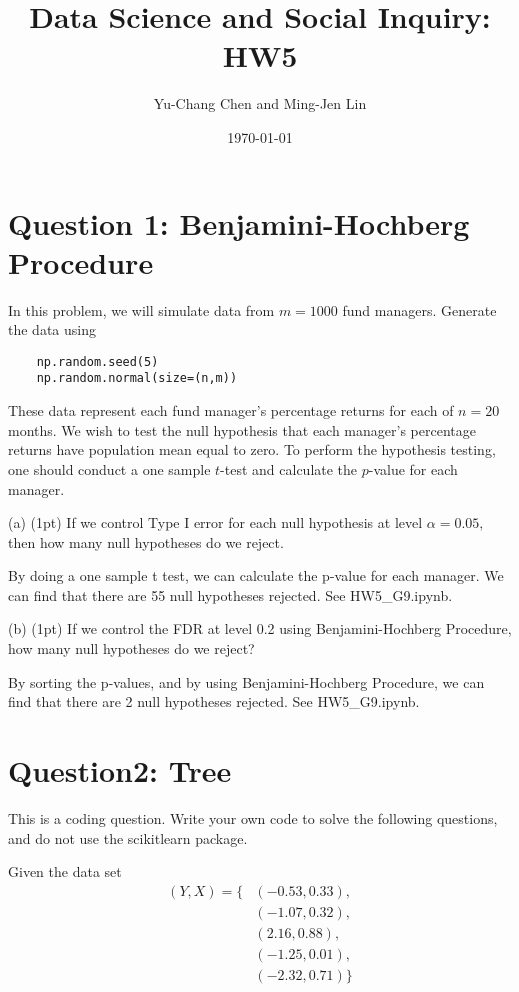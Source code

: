 \documentclass[11pt, oneside]{exam}   	%
\title{Data Science and Social Inquiry: HW5}
\date{\today}
\begin{document}
\author{Yu-Chang Chen and Ming-Jen Lin}
\maketitle
\section*{Question 1: Benjamini-Hochberg Procedure}
In this problem, we will simulate data from $m=1000$ fund managers.
Generate the data using
\begin{lstlisting}
	np.random.seed(5)
	np.random.normal(size=(n,m))
\end{lstlisting}
These data represent each fund manager's percentage returns for each of $n=20$ months.
We wish to test the null hypothesis that each manager's percentage returns have population mean
equal to zero. To perform the hypothesis testing, one should
conduct a one sample $t$-test and calculate the $p$-value for each manager.

(a) (1pt) If we control Type I error for each null hypothesis at level $\alpha=0.05,$
then how many null hypotheses do we reject.
\begin{solution}
By doing a one sample t test, we can calculate the p-value for each manager. We can find that there are 55 null hypotheses rejected. See HW5\_G9.ipynb.
\end{solution}

(b) (1pt) If we control the FDR at level 0.2 using Benjamini-Hochberg Procedure, how many null hypotheses do we reject?

\begin{solution}
By sorting the p-values, and by using Benjamini-Hochberg Procedure, we can find that there are 2 null hypotheses rejected. See HW5\_G9.ipynb.
\end{solution}


\section*{Question2: Tree}
This is a coding question. Write your own code to solve the following questions, and do not use the scikitlearn package.

Given the data set
\begin{align*}
	(Y, X)=\{ & (-0.53, 0.33),  \\
	          & (-1.07, 0.32),  \\
	          & (2.16, 0.88),   \\
	          & (-1.25, 0.01),  \\
	          & (-2.32, 0.71)\}
\end{align*}
\end{document}

